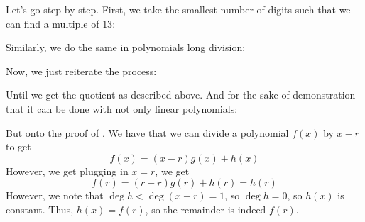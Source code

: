 \documentclass[11pt,titlepage]{scrartcl}
\begin{document}
Let's go step by step. First, we take the smallest number of digits such that we can find a multiple of $13$:
\begin{center}\end{center}
Similarly, we do the same in polynomials long division:
\begin{center}\end{center}
Now, we just reiterate the process:
\begin{center}\end{center}
\begin{center}\end{center}
Until we get the quotient as described above. And for the sake of demonstration that it can be done with not only linear polynomials:
\begin{center}\end{center}
But onto the proof of . We have that we can divide a polynomial $f(x)$ by $x-r$ to get
\[f(x)=(x-r)g(x)+h(x)\]
However, we get plugging in $x=r$, we get
\[f(r)=(r-r)g(r)+h(r)=h(r)\]
However, we note that $\deg h<\deg (x-r)=1$, so $\deg h=0$, so $h(x)$ is constant. Thus, $h(x)=f(r)$, so the remainder is indeed $f(r)$.
\end{document}
